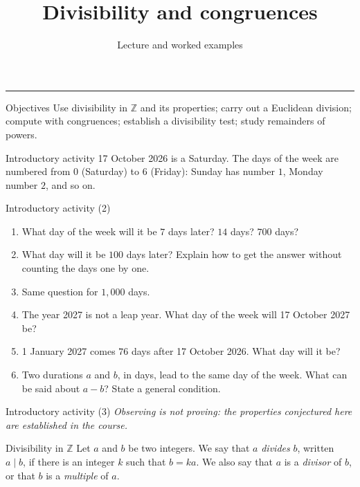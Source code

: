 \documentclass[aspectratio=169,10pt]{beamer}
\title{Divisibility and congruences}
\subtitle{Lecture and worked examples}
\date{}
\author{}
\providecommand{\Z}{\mathbb{Z}}
\begin{document}
\begin{frame}[plain]
\vfill
{\inserttitle\par}
\medskip
{\insertsubtitle\par}
\medskip
{\rule{\textwidth}{.5pt}}
\vfill
\end{frame}
\begin{frame}{Objectives}
Use divisibility in \(\Z\) and its properties; carry out a Euclidean division; compute with congruences; establish a divisibility test; study remainders of powers.
\end{frame}
\begin{frame}{Introductory activity}
17 October 2026 is a Saturday. The days of the week are numbered from \(0\) (Saturday) to \(6\) (Friday): Sunday has number \(1\), Monday number \(2\), and so on.
\end{frame}
\begin{frame}{Introductory activity (2)}
\begin{enumerate}
\setcounter{enumi}{0}
\item What day of the week will it be \(7\) days later? \(14\) days? \(700\) days?

\item What day will it be \(100\) days later? Explain how to get the answer without counting the days one by one.

\item Same question for \(1{,}000\) days.

\item The year 2027 is not a leap year. What day of the week will 17 October 2027 be?

\item 1 January 2027 comes \(76\) days after 17 October 2026. What day will it be?

\item Two durations \(a\) and \(b\), in days, lead to the same day of the week. What can be said about \(a-b\)? State a general condition.

\end{enumerate}
\end{frame}
\begin{frame}{Introductory activity (3)}
\emph{Observing is not proving: the properties conjectured here are established in the course.}
\end{frame}
\begin{frame}{Divisibility in \(\Z\)}
Let \(a\) and \(b\) be two integers. We say that \(a\) \emph{divides} \(b\), written \(a\mid b\), if there is an integer \(k\) such that \(b=ka\). We also say that \(a\) is a \emph{divisor} of \(b\), or that \(b\) is a \emph{multiple} of \(a\).
\end{frame}
\end{document}
